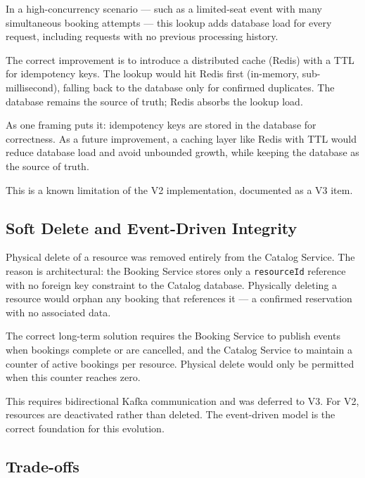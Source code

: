 In a high-concurrency scenario --- such as a limited-seat event with many simultaneous booking attempts --- this lookup adds database load for every request, including requests with no previous processing history.

The correct improvement is to introduce a distributed cache (Redis) with a TTL for idempotency keys. The lookup would hit Redis first (in-memory, sub-millisecond), falling back to the database only for confirmed duplicates. The database remains the source of truth; Redis absorbs the lookup load.

As one framing puts it: idempotency keys are stored in the database for correctness. As a future improvement, a caching layer like Redis with TTL would reduce database load and avoid unbounded growth, while keeping the database as the source of truth.

This is a known limitation of the V2 implementation, documented as a V3 item.

\subsection{Soft Delete and Event-Driven Integrity}

Physical delete of a resource was removed entirely from the Catalog Service. The reason is architectural: the Booking Service stores only a \texttt{resourceId} reference with no foreign key constraint to the Catalog database. Physically deleting a resource would orphan any booking that references it --- a confirmed reservation with no associated data.

The correct long-term solution requires the Booking Service to publish events when bookings complete or are cancelled, and the Catalog Service to maintain a counter of active bookings per resource. Physical delete would only be permitted when this counter reaches zero.

This requires bidirectional Kafka communication and was deferred to V3. For V2, resources are deactivated rather than deleted. The event-driven model is the correct foundation for this evolution.

\subsection{Trade-offs}

